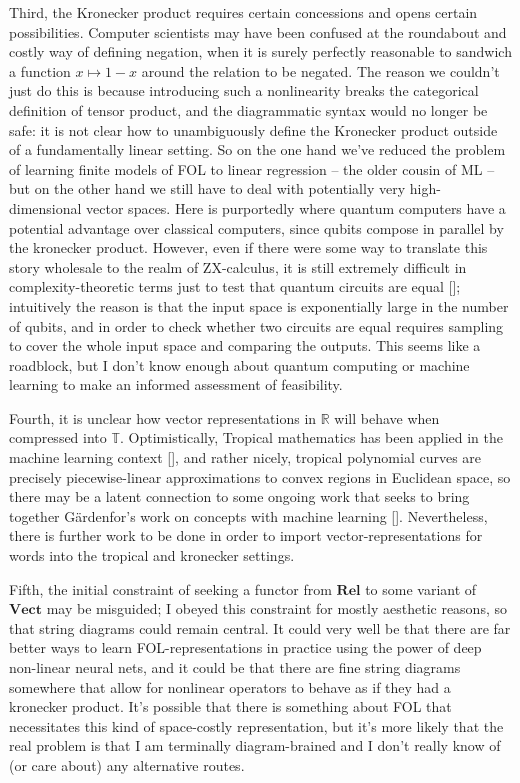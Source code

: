 \begin{fullwidth}
Third, the Kronecker product requires certain concessions and opens certain possibilities. Computer scientists may have been confused at the roundabout and costly way of defining negation, when it is surely perfectly reasonable to sandwich a function $x \mapsto 1-x$ around the relation to be negated. The reason we couldn't just do this is because introducing such a nonlinearity breaks the categorical definition of tensor product, and the diagrammatic syntax would no longer be safe: it is not clear how to unambiguously define the Kronecker product outside of a fundamentally linear setting. So on the one hand we've reduced the problem of learning finite models of FOL to linear regression -- the older cousin of ML -- but on the other hand we still have to deal with potentially very high-dimensional vector spaces. Here is purportedly where quantum computers have a potential advantage over classical computers, since qubits compose in parallel by the kronecker product. However, even if there were some way to translate this story wholesale to the realm of ZX-calculus, it is still extremely difficult in complexity-theoretic terms just to test that quantum circuits are equal []; intuitively the reason is that the input space is exponentially large in the number of qubits, and in order to check whether two circuits are equal requires sampling to cover the whole input space and comparing the outputs. This seems like a roadblock, but I don't know enough about quantum computing or machine learning to make an informed assessment of feasibility.

Fourth, it is unclear how vector representations in $\mathbb{R}$ will behave when compressed into $\mathbb{T}$. Optimistically, Tropical mathematics has been applied in the machine learning context [], and rather nicely, tropical polynomial curves are precisely piecewise-linear approximations to convex regions in Euclidean space, so there may be a latent connection to some ongoing work that seeks to bring together G\"{a}rdenfor's work on concepts with machine learning []. Nevertheless, there is further work to be done in order to import vector-representations for words into the tropical and kronecker settings.

Fifth, the initial constraint of seeking a functor from $\textbf{Rel}$ to some variant of $\textbf{Vect}$ may be misguided; I obeyed this constraint for mostly aesthetic reasons, so that string diagrams could remain central. It could very well be that there are far better ways to learn FOL-representations in practice using the power of deep non-linear neural nets, and it could be that there are fine string diagrams somewhere that allow for nonlinear operators to behave as if they had a kronecker product. It's possible that there is something about FOL that necessitates this kind of space-costly representation, but it's more likely that the real problem is that I am terminally diagram-brained and I don't really know of (or care about) any alternative routes.


\end{fullwidth}

